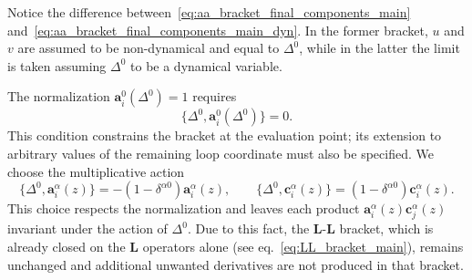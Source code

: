 Notice the difference between~\eqref{eq:aa_bracket_final_components_main} and~\eqref{eq:aa_bracket_final_components_main_dyn}. In the former bracket, $u$ and $v$ are assumed to be non-dynamical and equal to $\Delta^0$, while in the latter the limit is taken assuming $\Delta^0$ to be a dynamical variable.



The normalization $\mathbf{a}_i^0(\Delta^0)=1$ requires
\begin{equation}
\{\Delta^0,\mathbf{a}_i^0(\Delta^0) \}=0.
\end{equation}
This condition constrains the bracket at the evaluation point; its extension to arbitrary values of the remaining loop coordinate must also be specified. We choose the multiplicative action
\begin{equation}
\label{eq:D1_ab_comm_main}
\{\Delta^0,\mathbf{a}_i^\alpha(z) \}
=-(1-\delta^{\alpha0})\mathbf{a}_i^\alpha(z),
\qquad
\{\Delta^0,\mathbf{c}_i^\alpha(z) \}
=(1-\delta^{\alpha0})\mathbf{c}_i^\alpha(z).
\end{equation}
This choice respects the normalization and leaves each product
$\mathbf{a}_i^\alpha(z)\mathbf{c}_j^\alpha(z)$ invariant under the action of $\Delta^0$. 
Due to this fact, the $\mathbf{L}$-$\mathbf{L}$ bracket, which is already closed on the $\mathbf{L}$ operators alone (see eq.~\eqref{eq:LL_bracket_main}), remains unchanged and additional unwanted derivatives are not produced in that bracket.


